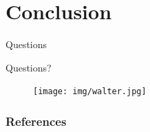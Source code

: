 \documentclass{beamer}
\begin{document}
\section{Conclusion}
\begin{frame}{Questions}
	\begin{center}
		\Huge{Questions?}
	\end{center}
	\begin{figure}
		\centering
		\texttt{[image: img/walter.jpg]}
	\end{figure}
\end{frame}
\begin{frame}[allowframebreaks]
	\frametitle{References}
	\printbibliography{}
\end{frame}
\end{document}
